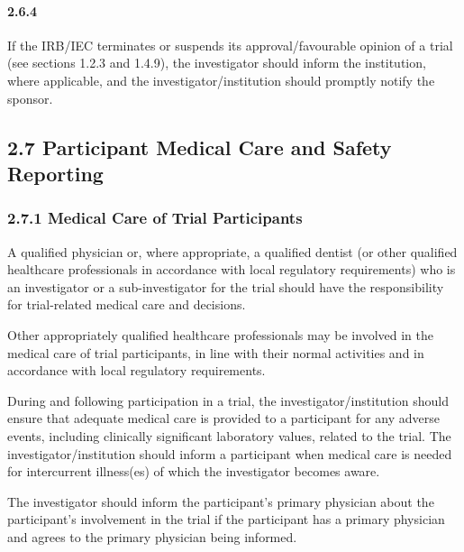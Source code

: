 \documentclass[11pt]{article}
\begin{document}
\paragraph{2.6.4} If the IRB/IEC terminates or suspends its approval/favourable opinion of a trial (see sections 1.2.3 and 1.4.9), the investigator should inform the institution, where applicable, and the investigator/institution should promptly notify the sponsor.

\subsection{2.7 Participant Medical Care and Safety Reporting}

\subsubsection{2.7.1 Medical Care of Trial Participants}

\begin{description}[leftmargin=2.5cm,style=sameline]

\item[(a)] A qualified physician or, where appropriate, a qualified dentist (or other qualified healthcare professionals in accordance with local regulatory requirements) who is an investigator or a sub-investigator for the trial should have the responsibility for trial-related medical care and decisions.

\item[(b)] Other appropriately qualified healthcare professionals may be involved in the medical care of trial participants, in line with their normal activities and in accordance with local regulatory requirements.

\item[(c)] During and following participation in a trial, the investigator/institution should ensure that adequate medical care is provided to a participant for any adverse events, including clinically significant laboratory values, related to the trial. The investigator/institution should inform a participant when medical care is needed for intercurrent illness(es) of which the investigator becomes aware.

\item[(d)] The investigator should inform the participant's primary physician about the participant's involvement in the trial if the participant has a primary physician and agrees to the primary physician being informed.

\end{description}
\end{document}
